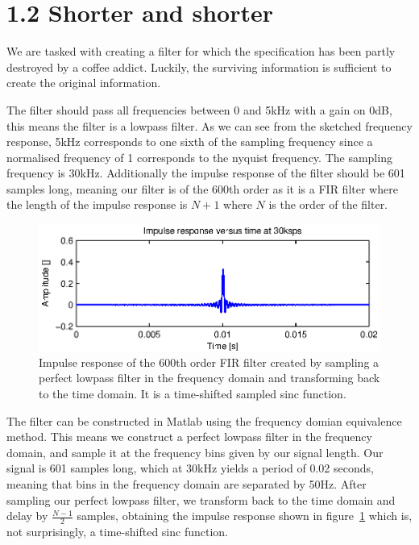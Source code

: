 \section{1.2 Shorter and shorter}
We are tasked with creating a filter for which the specification has been partly destroyed by a coffee addict.
Luckily, the surviving information is sufficient to create the original information.

The filter should pass all frequencies between 0 and 5kHz with a gain on 0dB, this means the filter is a lowpass filter.
As we can see from the sketched frequency response, 5kHz corresponds to one sixth of the sampling frequency since a 
normalised frequency of 1 corresponds to the nyquist frequency. The sampling frequency is 30kHz. 
Additionally the impulse response of the filter should be 601 samples long, meaning our filter is of the 600th order
as it is a FIR filter where the length of the impulse response is \(N+1\) where \(N\) is the order of the filter.

\begin{figure}
	\center
	\includegraphics{./picture/ha9_1_2_1.eps}
	\caption{Impulse response of the 600th order FIR filter created by sampling a perfect lowpass filter in the frequency domain
	and transforming back to the time domain. It is a time-shifted sampled sinc function.}
	\label{fig:1_2_ir}
\end{figure}

The filter can be constructed in Matlab using the frequency domian equivalence method. This means we construct a 
perfect lowpass filter in the frequency domain, and sample it at the frequency bins given by our signal length.
Our signal is 601 samples long, which at 30kHz yields a period of 0.02 seconds, meaning that bins in the frequency
domain are separated by 50Hz. After sampling our perfect lowpass filter, we transform back to the time domain and delay by \(\frac{N-1}{2}\) samples, 
obtaining the impulse response shown in figure~\ref{fig:1_2_ir} which is, not surprisingly, a time-shifted sinc function.


